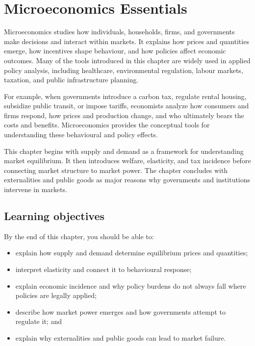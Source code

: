 \documentclass[
  11pt,
  oneside]{book}
\providecommand{\tightlist}{%
  \setlength{\itemsep}{0pt}\setlength{\parskip}{0pt}}
\begin{document}
\chapter{Microeconomics Essentials}\label{micro}

Microeconomics studies how individuals, households, firms, and governments make decisions and interact within markets. It explains how prices and quantities emerge, how incentives shape behaviour, and how policies affect economic outcomes. Many of the tools introduced in this chapter are widely used in applied policy analysis, including healthcare, environmental regulation, labour markets, taxation, and public infrastructure planning.

For example, when governments introduce a carbon tax, regulate rental housing, subsidize public transit, or impose tariffs, economists analyze how consumers and firms respond, how prices and production change, and who ultimately bears the costs and benefits. Microeconomics provides the conceptual tools for understanding these behavioural and policy effects.

This chapter begins with supply and demand as a framework for understanding market equilibrium. It then introduces welfare, elasticity, and tax incidence before connecting market structure to market power. The chapter concludes with externalities and public goods as major reasons why governments and institutions intervene in markets.

\section{Learning objectives}\label{learning-objectives-1}

By the end of this chapter, you should be able to:

\begin{itemize}
\tightlist
\item
  explain how supply and demand determine equilibrium prices and quantities;
\item
  interpret elasticity and connect it to behavioural response;
\item
  explain economic incidence and why policy burdens do not always fall where policies are legally applied;
\item
  describe how market power emerges and how governments attempt to regulate it; and
\item
  explain why externalities and public goods can lead to market failure.
\end{itemize}
\end{document}

